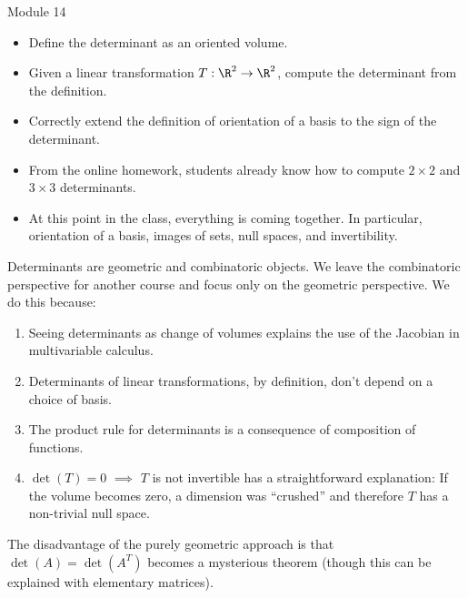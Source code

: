 \begin{lesson}

	Module 14

	\begin{itemize}
		\item Define the determinant as an oriented volume.
		\item Given a linear transformation $T:\R^2\to\R^2$,
			compute the determinant from the definition.
		\item Correctly extend the definition of orientation of a basis to the sign
			of the determinant.
	\end{itemize}

	\begin{annotation}
		\begin{notes}
			\begin{itemize}
				\item From the online homework, students already know how to compute $2\times 2$ and
					$3\times 3$ determinants.
				\item At this point in the class, everything is coming together. In particular, orientation
					of a basis, images of sets, null spaces, and invertibility.
			\end{itemize}
		\end{notes}
	\end{annotation}
	Determinants are geometric and combinatoric objects. We leave the combinatoric perspective for another
	course and focus only on the geometric perspective. We do this because:
	\begin{enumerate}
		\item Seeing determinants as change of volumes explains the use of the Jacobian in multivariable calculus.
		\item Determinants of linear transformations, by definition, don't depend on a choice of basis.
		\item The product rule for determinants is a consequence of composition of functions.
		\item $\det(T) = 0$ $\implies$ $T$ is not invertible has a straightforward explanation: If the volume
			becomes zero, a dimension was ``crushed'' and therefore $T$ has a non-trivial null space.
	\end{enumerate}
	The disadvantage of the purely geometric approach is that $\det(A)=\det(A^T)$ becomes a mysterious theorem
	(though this can be explained with elementary matrices).



\end{lesson}
	\bookonlynewpage
